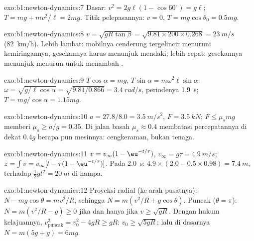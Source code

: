 \begin{solution}{exo:b1:newton-dynamics:7}
Dasar: $v^2 = 2g\ell(1 - \cos 60^\circ) = g\ell$; $T = mg + mv^2/\ell =
2mg$. Titik pelepasannya: $v = 0$, $T = mg\cos\theta_0 = 0.5mg$.
\end{solution}

\begin{solution}{exo:b1:newton-dynamics:8}
$v = \sqrt{gR\tan\beta} = \sqrt{9.81 \times 200 \times 0.268} = \qty{23}{m/s}$
(\qty{82}{km/h}). Lebih lambat: mobilnya cenderung tergelincir menuruni
kemiringannya, gesekannya harus menunjuk mendaki; lebih cepat:
gesekannya menunjuk menurun untuk menambah .
\end{solution}

\begin{solution}{exo:b1:newton-dynamics:9}
$T\cos\alpha = mg$, $T\sin\alpha = m\omega^2\ell\sin\alpha$: $\omega =
\sqrt{g/\ell\cos\alpha} = \sqrt{9.81/0.866} = \qty{3.4}{rad/s}$, periodenya
\qty{1.9}{s}; $T = mg/\cos\alpha = 1.15mg$.
\end{solution}

\begin{solution}{exo:b1:newton-dynamics:10}
$a = 27.8/8.0 = \qty{3.5}{m/s^2}$, $F = \qty{3.5}{kN}$; $F \leq \mu_smg$
memberi $\mu_s \geq a/g = 0.35$. Di jalan basah $\mu_s \approx 0.4$
membatasi percepatannya di dekat $0.4g$ berapa pun mesinnya: cengkeraman, bukan tenaga.
\end{solution}

\begin{solution}{exo:b1:newton-dynamics:11}
$v = v_\infty(1 - \eu^{-t/\tau})$, $v_\infty = g\tau = \qty{4.9}{m/s}$;
$z = \int v = v_\infty[t - \tau(1 - \eu^{-t/\tau})]$. Pada \qty{2.0}{s}:
$4.9 \times (2.0 - 0.5 \times 0.98) = \qty{7.4}{m}$, terhadap $\tfrac12 gt^2
= \qty{20}{m}$ di hampa.
\end{solution}

\begin{solution}{exo:b1:newton-dynamics:12}
Proyeksi radial (ke arah pusatnya): $N - mg\cos\theta = mv^2/R$, sehingga
$N = m(v^2/R + g\cos\theta)$. Puncak ($\theta = \pi$): $N = m(v^2/R - g)
\geq 0$ jika dan hanya jika $v \geq \sqrt{gR}$. Dengan hukum kelajuannya, $v_{\text{puncak}}^2 =
v_0^2 - 4gR \geq gR$: $v_0 \geq \sqrt{5gR}$; lalu di dasarnya $N =
m(5g + g) = 6mg$.
\end{solution}

